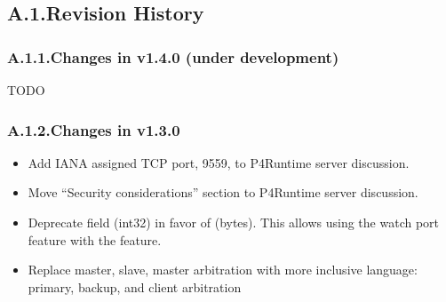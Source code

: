 \documentclass[11pt]{article}
\begin{document}
{%
\subsection{A.1.\hspace*{0.5em}Revision History}\label{sec-revision-history}%

\subsubsection{A.1.1.\hspace*{0.5em}Changes in v1.4.0 (under development)}\label{sec-changes-in-v140-under-development}%

\noindent{}TODO%

\subsubsection{A.1.2.\hspace*{0.5em}Changes in v1.3.0}\label{sec-changes-in-v130}%

\begin{itemize}[noitemsep,topsep=\mdcompacttopsep]%

\item{}Add IANA assigned TCP port, 9559, to P4Runtime server discussion.%

\item{}Move \textquotedblleft{}Security considerations\textquotedblright{} section to P4Runtime server discussion.%

\item{}Deprecate  field (int32) in favor of  (bytes). This allows
using the watch port feature with the  feature.%

\item{}Replace master, slave, master arbitration with more inclusive language:
primary, backup, and client arbitration%


\end{itemize}}
\end{document}
